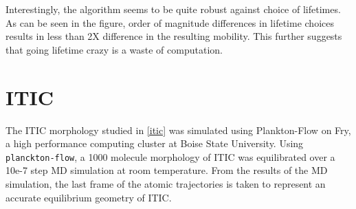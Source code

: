 Interestingly, the algorithm seems to be quite robust against choice of lifetimes. As can be seen in the
figure, order of magnitude differences in lifetime choices results in less than 2X difference in the resulting
mobility. This further suggests that going lifetime crazy is a waste of computation.  

\section{ITIC}
\label{itic}
The ITIC morphology studied in \autoref{itic} was simulated using Plankton-Flow \cite{cmelab} on Fry,         
a high performance computing cluster at Boise State University.  
Using \texttt{planckton-flow}, a 1000
molecule morphology of ITIC was equilibrated over a 10e-7 step MD simulation at room temperature. 
From the results of the MD
simulation, the last frame of the atomic trajectories is taken to represent an accurate equilibrium geometry
of ITIC. 

